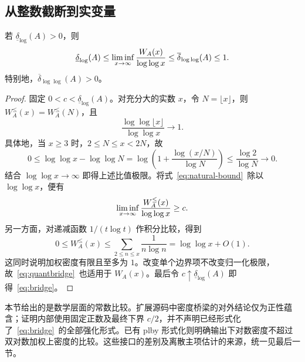 \subsection{从整数截断到实变量}
\begin{proposition}[密度桥梁]\label{prop:bridge}
若 $\underline\delta_{\log}(A)>0$，则
\begin{equation}\label{eq:bridge}
 \underline\delta_{\log}(A)
 \le\liminf_{x\to\infty}\frac{W_A(x)}{\log\log x}
 \le\overline\delta_{\log\log}(A)\le1.
\end{equation}
特别地，$\overline\delta_{\log\log}(A)>0$。
\end{proposition}
\begin{proof}
固定 $0<c<\underline\delta_{\log}(A)$。对充分大的实数 $x$，令 $N=\lfloor x\rfloor$，则
$W_A^{\le}(x)=W_A^{\le}(N)$，且
\[
 \frac{\log\log\lfloor x\rfloor}{\log\log x}\longrightarrow1.
\]
具体地，当 $x\ge3$ 时，$2\le N\le x<2N$，故
\[
 0\le\log\log x-\log\log N
 =\log\left(1+\frac{\log(x/N)}{\log N}\right)
 \le\frac{\log2}{\log N}\longrightarrow0.
\]
结合 $\log\log x\to\infty$ 即得上述比值极限。将式~\eqref{eq:natural-bound}~除以 $\log\log x$，便有
\begin{equation}\label{eq:quantbridge}
 \liminf_{x\to\infty}\frac{W_A^{\le}(x)}{\log\log x}\ge c.
\end{equation}
另一方面，对递减函数 $1/(t\log t)$ 作积分比较，得到
\[
 0\le W_A^{\le}(x)\le\sum_{2\le n\le x}\frac1{n\log n}
 =\log\log x+O(1).
\]
这同时说明加权密度有限且至多为 $1$。改变单个边界项不改变归一化极限，故~\eqref{eq:quantbridge}~也适用于 $W_A(x)$。最后令 $c\uparrow\underline\delta_{\log}(A)$ 即得~\eqref{eq:bridge}。
\end{proof}

本节给出的是数学层面的常数比较。扩展源码中密度桥梁的对外结论仅为正性蕴含；证明内部使用固定正数及最终下界 $c/2$，并不声明已经形式化了~\eqref{eq:bridge}~的全部强化形式。已有 plby 形式化则明确输出下对数密度不超过双对数加权上密度的比较\cite{plby}。这些接口的差别及离散主项估计的来源，统一见最后一节。
